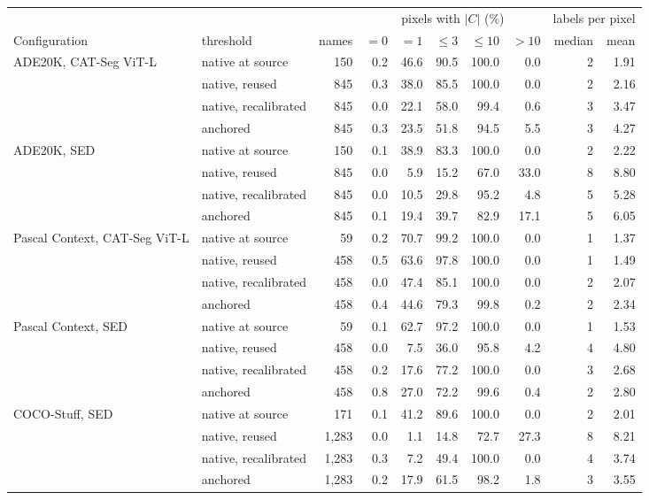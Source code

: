 \begin{tabular}{@{}llrrrrrrrr@{}}
\toprule
& & & \multicolumn{5}{c}{pixels with $|C|$ (\%)} & \multicolumn{2}{c}{labels per pixel} \\
\cmidrule(lr){4-8}\cmidrule(l){9-10}
Configuration & threshold & names & $=0$ & $=1$ & $\le 3$ & $\le 10$ & $>10$ & median & mean \\
\midrule
ADE20K, CAT-Seg ViT-L & native at source & 150 & 0.2 & 46.6 & 90.5 & 100.0 & 0.0 & 2 & 1.91 \\
 & native, reused & 845 & 0.3 & 38.0 & 85.5 & 100.0 & 0.0 & 2 & 2.16 \\
 & native, recalibrated & 845 & 0.0 & 22.1 & 58.0 & 99.4 & 0.6 & 3 & 3.47 \\
 & anchored & 845 & 0.3 & 23.5 & 51.8 & 94.5 & 5.5 & 3 & 4.27 \\
\addlinespace
ADE20K, SED & native at source & 150 & 0.1 & 38.9 & 83.3 & 100.0 & 0.0 & 2 & 2.22 \\
 & native, reused & 845 & 0.0 & 5.9 & 15.2 & 67.0 & 33.0 & 8 & 8.80 \\
 & native, recalibrated & 845 & 0.0 & 10.5 & 29.8 & 95.2 & 4.8 & 5 & 5.28 \\
 & anchored & 845 & 0.1 & 19.4 & 39.7 & 82.9 & 17.1 & 5 & 6.05 \\
\addlinespace
Pascal Context, CAT-Seg ViT-L & native at source & 59 & 0.2 & 70.7 & 99.2 & 100.0 & 0.0 & 1 & 1.37 \\
 & native, reused & 458 & 0.5 & 63.6 & 97.8 & 100.0 & 0.0 & 1 & 1.49 \\
 & native, recalibrated & 458 & 0.0 & 47.4 & 85.1 & 100.0 & 0.0 & 2 & 2.07 \\
 & anchored & 458 & 0.4 & 44.6 & 79.3 & 99.8 & 0.2 & 2 & 2.34 \\
\addlinespace
Pascal Context, SED & native at source & 59 & 0.1 & 62.7 & 97.2 & 100.0 & 0.0 & 1 & 1.53 \\
 & native, reused & 458 & 0.0 & 7.5 & 36.0 & 95.8 & 4.2 & 4 & 4.80 \\
 & native, recalibrated & 458 & 0.2 & 17.6 & 77.2 & 100.0 & 0.0 & 3 & 2.68 \\
 & anchored & 458 & 0.8 & 27.0 & 72.2 & 99.6 & 0.4 & 2 & 2.80 \\
\addlinespace
COCO-Stuff, SED & native at source & 171 & 0.1 & 41.2 & 89.6 & 100.0 & 0.0 & 2 & 2.01 \\
 & native, reused & 1,283 & 0.0 & 1.1 & 14.8 & 72.7 & 27.3 & 8 & 8.21 \\
 & native, recalibrated & 1,283 & 0.3 & 7.2 & 49.4 & 100.0 & 0.0 & 4 & 3.74 \\
 & anchored & 1,283 & 0.2 & 17.9 & 61.5 & 98.2 & 1.8 & 3 & 3.55 \\
\bottomrule
\end{tabular}

